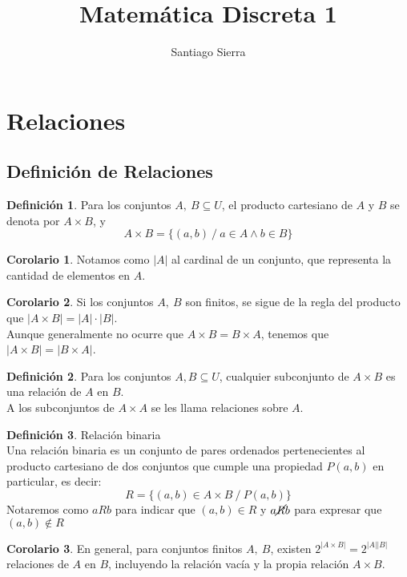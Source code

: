 \documentclass[10pt]{article}
\title{Matemática Discreta 1}
\author{Santiago Sierra}
\theoremstyle{definition}
\newtheorem{definition}{Definición}[section]
\newtheorem{corollary}{Corolario}[theorem]
\begin{document}
    \maketitle \tableofcontents \newpage
    \section{Relaciones}
    \subsection{Definición de Relaciones}
    \begin{definition}
        Para los conjuntos $A,\ B \subseteq U$, el producto cartesiano de $A$ y $B$ se denota por $A\times B$, y $$A\times B=\{(a,b)\ /\ a\in A \wedge b\in B\}$$
    \end{definition}
    \begin{corollary}
        Notamos como $|A|$ al cardinal de un conjunto, que representa la cantidad de elementos en $A$.
    \end{corollary}
    \begin{corollary}
        Si los conjuntos $A,\ B$ son finitos, se sigue de la regla del producto que $|A\times B|=|A|\cdot|B|$.\\
        Aunque generalmente no ocurre que $A\times B=B\times A$, tenemos que $|A\times B|=|B\times A|$.
    \end{corollary}
    \begin{definition}
        Para los conjuntos $A,B\subseteq U$, cualquier subconjunto de $A\times B$ es una relación de $A$ en $B$.\\
        A los subconjuntos de $A\times A$ se les llama relaciones sobre $A$.
    \end{definition}
    \begin{definition}{Relación binaria}
        \\Una relación binaria es un conjunto de pares ordenados pertenecientes al producto cartesiano de dos conjuntos que cumple una propiedad $P(a,b)$ en particular, es decir: $$R=\{(a,b)\in A\times B\ /\ P(a,b)\}$$
        Notaremos como $aRb$ para indicar que $(a,b)\in R$ y $a\cancel{R}b$ para expresar que $(a,b)\notin R$
    \end{definition}
    \begin{corollary}
        En general, para conjuntos finitos $A,\ B$, existen $2^{|A\times B|}=2^{|A||B|}$ relaciones de $A$ en $B$, incluyendo la relación vacía y la propia relación $A\times B$.
    \end{corollary}
\end{document}
